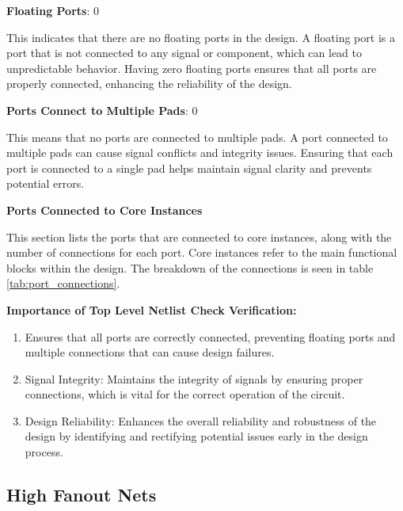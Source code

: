\textbf{Floating Ports}: 0

This indicates that there are no floating ports in the design. A floating port is a port that is not connected to any signal or component, which can lead to unpredictable behavior. Having zero floating ports ensures that all ports are properly connected, enhancing the reliability of the design.

\textbf{Ports Connect to Multiple Pads}: 0

This means that no ports are connected to multiple pads. A port connected to multiple pads can cause signal conflicts and integrity issues. Ensuring that each port is connected to a single pad helps maintain signal clarity and prevents potential errors.

\textbf{Ports Connected to Core Instances}

This section lists the ports that are connected to core instances, along with the number of connections for each port. Core instances refer to the main functional blocks within the design. The breakdown of the connections is seen in table \ref{tab:port_connections}.

\vspace{10pt}

\textbf{Importance of Top Level Netlist Check Verification:} 

\begin{enumerate}
    \item Ensures that all ports are correctly connected, preventing floating ports and multiple connections that can cause design failures.
    \item Signal Integrity: Maintains the integrity of signals by ensuring proper connections, which is vital for the correct operation of the circuit.
    \item Design Reliability: Enhances the overall reliability and robustness of the design by identifying and rectifying potential issues early in the design process.
\end{enumerate}

\subsection{High Fanout Nets}

